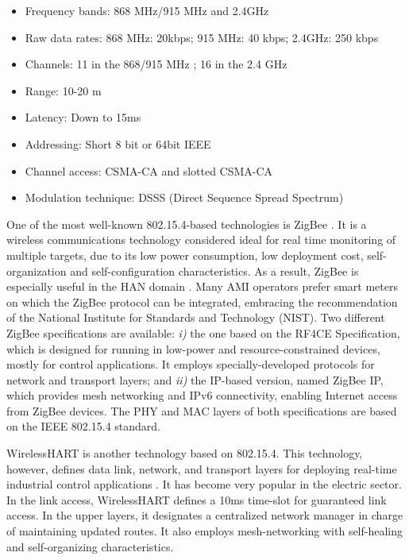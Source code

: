 \documentclass[10pt,twocolumn,twoside,submit]{JCNtran}
\begin{document}
\begin{itemize}
	\item Frequency bands: 868 MHz/915 MHz and 2.4GHz
	\item Raw data rates: 868 MHz: 20kbps; 915 MHz: 40 kbps; 2.4GHz: 250 kbps
	\item Channels: 11 in the 868/915 MHz ; 16 in the 2.4 GHz
	\item Range: 10-20 m
	\item Latency: Down to 15ms
	\item Addressing: Short  8 bit or 64bit IEEE
	\item Channel access: CSMA-CA and slotted CSMA-CA
	\item Modulation technique: DSSS (Direct Sequence Spread Spectrum)
\end{itemize}  

One of the most well-known 802.15.4-based technologies is ZigBee \cite{Alliance2010}. It is a wireless communications technology considered ideal for real time monitoring of multiple targets, due to its low power consumption, low deployment cost, self-organization and self-configuration characteristics. As a result, ZigBee is especially useful in the HAN domain \cite{Sabbah2014}. Many AMI operators prefer smart meters on which the ZigBee protocol can be integrated, embracing the recommendation of the National Institute for Standards and Technology (NIST). Two different ZigBee specifications are available: \textit{i)} the one based on the RF4CE Specification, which is designed for running in low-power and resource-constrained devices, mostly for control applications. It employs specially-developed protocols for network and transport layers; and \textit{ii)} the IP-based version, named ZigBee IP, which provides mesh networking and IPv6 connectivity, enabling Internet access from ZigBee devices. The PHY and MAC layers of both specifications are based on the IEEE 802.15.4 standard.  

WirelessHART is another technology based on 802.15.4. This technology, however, defines data link, network, and transport layers for deploying real-time industrial control applications \cite{Song2008}. It has become very popular in the electric sector. In the link access, WirelessHART defines a 10ms time-slot for guaranteed link access. In the upper layers, it designates a centralized network manager in charge of maintaining updated routes. It also employs mesh-networking with self-healing and self-organizing characteristics.
\end{document}
